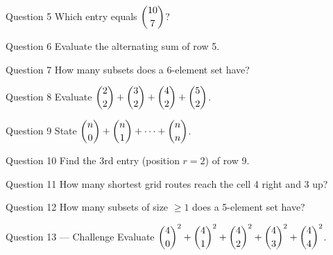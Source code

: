 \documentclass[11pt]{article}
\begin{document}
\begin{qbox}{Question 5}
Which entry equals $\dbinom{10}{7}$?\workspace{2.4cm}
\end{qbox}

\begin{qbox}{Question 6}
Evaluate the alternating sum of row 5.\workspace{2.4cm}
\end{qbox}

\begin{qbox}{Question 7}
How many subsets does a 6-element set have?\workspace{2.4cm}
\end{qbox}

\begin{qbox}{Question 8}
Evaluate $\dbinom{2}{2}+\dbinom{3}{2}+\dbinom{4}{2}+\dbinom{5}{2}$.\workspace{2.4cm}
\end{qbox}

\begin{qbox}{Question 9}
State $\dbinom{n}{0}+\dbinom{n}{1}+\cdots+\dbinom{n}{n}$.\workspace{2.4cm}
\end{qbox}

\begin{qbox}{Question 10}
Find the 3rd entry (position $r=2$) of row 9.\workspace{2.4cm}
\end{qbox}

\begin{qbox}{Question 11}
How many shortest grid routes reach the cell 4 right and 3 up?\workspace{2.4cm}
\end{qbox}

\begin{qbox}{Question 12}
How many subsets of size $\ge1$ does a 5-element set have?\workspace{2.4cm}
\end{qbox}

\begin{qbox}{Question 13 --- Challenge}
Evaluate $\dbinom{4}{0}^2+\dbinom{4}{1}^2+\dbinom{4}{2}^2+\dbinom{4}{3}^2+\dbinom{4}{4}^2$.\workspace{3cm}
\end{qbox}

\clearpage
{}
\end{document}

